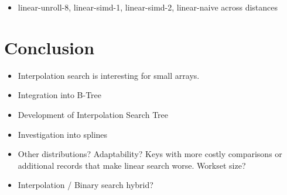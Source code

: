 \documentclass{article}
\begin{document}
\begin{itemize}
  \item linear-unroll-8, linear-simd-1, linear-simd-2, linear-naive across distances
\end{itemize}


\section{Conclusion}
\begin{itemize}
  \item Interpolation search is interesting for small arrays.
  \item Integration into B-Tree
  \item Development of Interpolation Search Tree
  \item Investigation into splines
  \item Other distributions? Adaptability? Keys with more costly comparisons or additional records that make linear search worse. Workset size?
\end{itemize}
\begin{itemize}
  \item Interpolation / Binary search hybrid?
\end{itemize}
\end{document}
